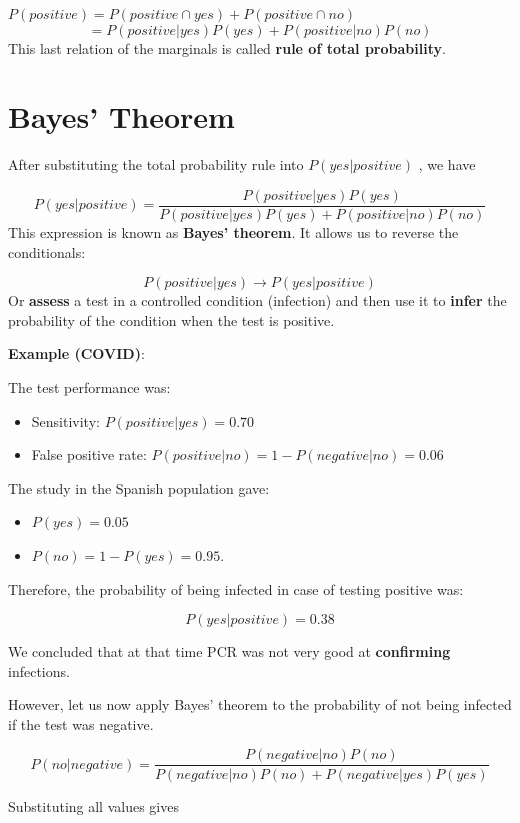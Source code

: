 \documentclass[
]{book}
\providecommand{\tightlist}{%
  \setlength{\itemsep}{0pt}\setlength{\parskip}{0pt}}
\begin{document}
\(P(positive)= P(positive \cap yes) + P(positive \cap no)\)
\[= P(positive| yes)P (yes)+P(positive|no)P(no)\]
This last relation of the marginals is called \textbf{rule of total probability}.

\hypertarget{bayes-theorem}{%
\section{Bayes' Theorem}\label{bayes-theorem}}

After substituting the total probability rule into \(P(yes| positive)\) , we have

\[P(yes| positive)= \frac{P(positive|yes)P(yes)}{P(positive|yes)P(yes)+P(positive|no)P(no)}\]
This expression is known as \textbf{Bayes' theorem}. It allows us to reverse the conditionals:

\[P(positive|yes) \rightarrow P(yes| positive)\]
Or \textbf{assess} a test in a controlled condition (infection) and then use it to \textbf{infer} the probability of the condition when the test is positive.

\textbf{Example (COVID)}:

The test performance was:

\begin{itemize}
\item
  Sensitivity: \(P(positive| yes)= 0.70\)
\item
  False positive rate: \(P(positive| no)= 1- P(negative|no)=0.06\)
\end{itemize}

The study in the Spanish population gave:

\begin{itemize}
\tightlist
\item
  \(P(yes)=0.05\)
\item
  \(P(no)=1-P(yes)=0.95\).
\end{itemize}

Therefore, the probability of being infected in case of testing positive was:

\[P(yes| positive)= 0.38\]

We concluded that at that time PCR was not very good at \textbf{confirming} infections.

However, let us now apply Bayes' theorem to the probability of not being infected if the test was negative.

\[P(no|negative) = \frac{P(negative|no) P(no )}{ P(negative|no) P(no)+P(negative|yes)P(yes)}\]

Substituting all values gives
\end{document}
